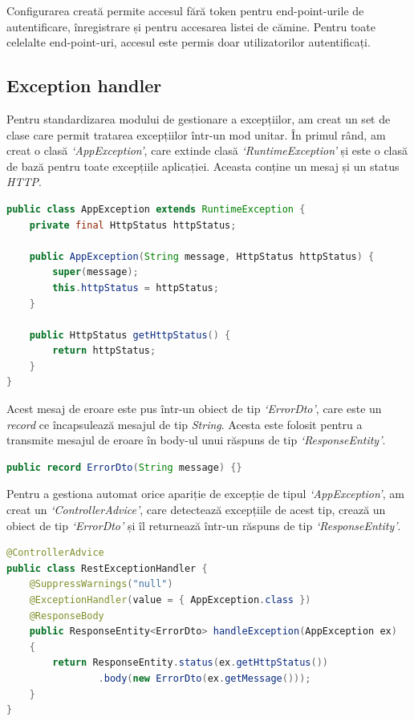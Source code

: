 \documentclass[12pt,a4paper]{report}
\theoremstyle{definition}
\theoremstyle{remark}
\begin{document}
\par Configurarea creată permite accesul fără token pentru end-point-urile de autentificare, înregistrare și pentru accesarea listei de cămine. Pentru toate celelalte end-point-uri, accesul este permis doar utilizatorilor autentificați.
\subsection{Exception handler}\label{sec:exception-handler}

\par Pentru standardizarea modului de gestionare a excepțiilor, am creat un set de clase care permit tratarea excepțiilor într-un mod unitar. În primul rând, am creat o clasă \textit{`AppException'}, care extinde clasă \textit{`RuntimeException'} și este o clasă de bază pentru toate excepțiile aplicației. Aceasta conține un mesaj și un status \textit{HTTP}.

\begin{lstlisting}[language=Java, caption={Clasa de bază pentru excepții}]
public class AppException extends RuntimeException {
    private final HttpStatus httpStatus;

    public AppException(String message, HttpStatus httpStatus) {
        super(message);
        this.httpStatus = httpStatus;
    }

    public HttpStatus getHttpStatus() {
        return httpStatus;
    }
}
\end{lstlisting}

\par Acest mesaj de eroare este pus într-un obiect de tip \textit{`ErrorDto'}, care este un \textit{record}\cite{baeldung_java_vs_final_class} ce încapsulează mesajul de tip \textit{String}. Acesta este folosit pentru a transmite mesajul de eroare în body-ul unui răspuns de tip \textit{`ResponseEntity'}.

\begin{lstlisting}[language=Java, caption={Record pentru mesaje de eroare}]
public record ErrorDto(String message) {}
\end{lstlisting}

\par Pentru a gestiona automat orice apariție de excepție de tipul \textit{`AppException'}, am creat un \textit{`ControllerAdvice'}, care detectează excepțiile de acest tip, crează un obiect de tip \textit{`ErrorDto'} și îl returnează într-un răspuns de tip \textit{`ResponseEntity'}.

\begin{lstlisting}[language=Java, caption={Clasă care gestionează excepțiile apărute}]
@ControllerAdvice
public class RestExceptionHandler {
    @SuppressWarnings("null")
    @ExceptionHandler(value = { AppException.class })
    @ResponseBody
    public ResponseEntity<ErrorDto> handleException(AppException ex)
    {
        return ResponseEntity.status(ex.getHttpStatus())
                .body(new ErrorDto(ex.getMessage()));
    }
}
\end{lstlisting}
\end{document}
